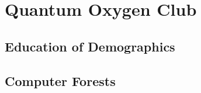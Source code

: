 \chapter{Quantum Oxygen Club}
\section{Education of Demographics}
\lipsum[1-6]

\section{Computer Forests}
\lipsum[1-7]